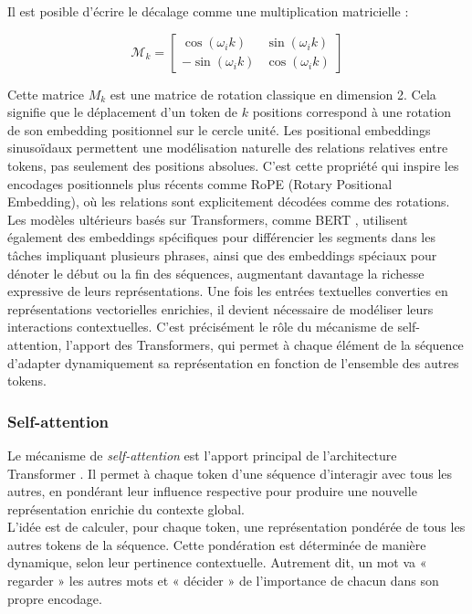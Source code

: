 Il est posible d'écrire le décalage comme une multiplication matricielle :

\begin{equation}
\mathcal{M}_k = \begin{bmatrix} \cos(\omega_i k) & \sin(\omega_i k) \\ -\sin(\omega_i k) & \cos(\omega_i k) \end{bmatrix}
\end{equation}

Cette matrice $M_k$ est une matrice de rotation classique en dimension 2. Cela signifie que le déplacement d'un token de $k$ positions correspond à une rotation de son embedding positionnel sur le cercle unité. Les positional embeddings sinusoïdaux permettent une modélisation naturelle des relations relatives entre tokens, pas seulement des positions absolues. C'est cette propriété qui inspire les encodages positionnels plus récents comme RoPE (Rotary Positional Embedding), où les relations sont explicitement décodées comme des rotations.\\

Les modèles ultérieurs basés sur Transformers, comme BERT \citep{devlin2018bert}, utilisent également des embeddings spécifiques pour différencier les segments dans les tâches impliquant plusieurs phrases, ainsi que des embeddings spéciaux pour dénoter le début ou la fin des séquences, augmentant davantage la richesse expressive de leurs représentations. Une fois les entrées textuelles converties en représentations vectorielles enrichies, il devient nécessaire de modéliser leurs interactions contextuelles. C’est précisément le rôle du mécanisme de self-attention, l'apport des Transformers, qui permet à chaque élément de la séquence d’adapter dynamiquement sa représentation en fonction de l’ensemble des autres tokens.

\subsubsection{Self-attention}

Le mécanisme de \textit{self-attention} est l'apport principal de l'architecture Transformer \citep{vaswani2017attention}. Il permet à chaque token d'une séquence d'interagir avec tous les autres, en pondérant leur influence respective pour produire une nouvelle représentation enrichie du contexte global.\\

L'idée est de calculer, pour chaque token, une représentation pondérée de tous les autres tokens de la séquence. Cette pondération est déterminée de manière dynamique, selon leur pertinence contextuelle. Autrement dit, un mot va « regarder » les autres mots et « décider » de l’importance de chacun dans son propre encodage.\\

